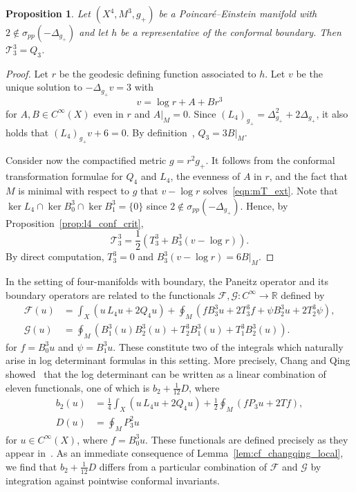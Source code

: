 \documentclass{amsart}
\newtheorem{prop}[thm]{Proposition}
\theoremstyle{definition}
\theoremstyle{remark}
\numberwithin{equation}{section}
\begin{document}
\begin{prop}
 \label{prop:mT_is_Q}
 Let $(X^4,M^3,g_+)$ be a Poincar\'e--Einstein manifold with $2\not\in\sigma_{pp}(-\Delta_{g_+})$ and let $h$ be a representative of the conformal boundary.  Then ${\mathcal{T}}_3^3=Q_3$.
\end{prop}

\begin{proof}
 Let $r$ be the geodesic defining function associated to $h$.  Let $v$ be the unique solution to $-\Delta_{g_+}v=3$ with
 \[ v = \log r + A + Br^3 \]
 for $A,B\in C^\infty(X)$ even in $r$ and $A{\rvert}_M=0$.  Since $(L_4)_{g_+}=\Delta_{g_+}^2+2\Delta_{g_+}$, it also holds that $(L_4)_{g_+}v+6=0$.  By definition~\cite{FeffermanGraham2002}, $Q_3=3B{\rvert}_M$.

 Consider now the compactified metric $g=r^2g_+$.  It follows from the conformal transformation formulae for $Q_4$ and $L_4$, the evenness of $A$ in $r$, and the fact that $M$ is minimal with respect to $g$ that $v-\log r$ solves~\eqref{eqn:mT_ext}.  Note that $\ker L_4\cap\ker B_0^3\cap\ker B_1^3=\{0\}$ since $2\not\in\sigma_{pp}(-\Delta_{g_+})$.  Hence, by Proposition~\ref{prop:l4_conf_crit},
 \[ {\mathcal{T}}_3^3 = \frac{1}{2}\left(T_3^3 + B_3^3(v-\log r)\right) . \]
 By direct computation, $T_3^3=0$ and $B_3^3(v-\log r)=6B{\rvert}_M$.
\end{proof}

In the setting of four-manifolds with boundary, the Paneitz operator and its boundary operators are related to the functionals ${\mathcal{F}},{\mathcal{G}}\colon C^\infty\to{\mathbb{R}}$ defined by
\begin{align*}
 {\mathcal{F}}(u) & = \int_X \left(u\,L_4u + 2Q_4u\right) + \oint_M \left( fB_3^3u + 2T_3^3f + \psi B_2^3u + 2T_2^3\psi\right), \\
 {\mathcal{G}}(u) & = \oint_M \left(B_1^3(u)B_2^3(u) + T_2^3B_1^3(u) + T_1^3B_2^3(u)\right) .
\end{align*}
for $f=B_0^3u$ and $\psi=B_1^3u$.  These constitute two of the integrals which naturally arise in log determinant formulas in this setting.  More precisely, Chang and Qing showed~\cite{ChangQing1997a} that the log determinant can be written as a linear combination of eleven functionals, one of which is $b_2+\frac{1}{12}D$, where
\begin{align*}
 b_2(u) & = \frac{1}{4}\int_X \left(u\,L_4u + 2Q_4u\right) + \frac{1}{2}\oint_M \left(fP_3u + 2Tf\right), \\
 D(u) & = \oint_M P_3^2u
\end{align*}
for $u\in C^\infty(X)$, where $f=B_0^3u$.  These functionals are defined precisely as they appear in~\cite[Theorem~3.3]{ChangQing1997a}.  As an immediate consequence of Lemma~\ref{lem:cf_changqing_local}, we find that $b_2+\frac{1}{12}D$ differs from a particular combination of ${\mathcal{F}}$ and ${\mathcal{G}}$ by integration against pointwise conformal invariants.
\end{document}
